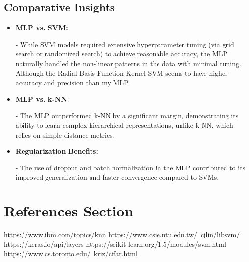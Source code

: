\documentclass[lettersize,journal]{IEEEtran}
\begin{document}
\subsection{\textbf{Comparative Insights}}
\begin{itemize}
    \item \textbf{MLP vs. SVM:}
    
    - While SVM models required extensive hyperparameter tuning (via grid search or randomized search) to achieve reasonable accuracy, the MLP naturally handled the non-linear patterns in the data with minimal tuning. Although the Radial Basis Function Kernel SVM seems to have higher accuracy and precision than my MLP.
    
    \item \textbf{MLP vs. k-NN:}
    
    - The MLP outperformed k-NN by a significant margin, demonstrating its ability to learn complex hierarchical representations, unlike k-NN, which relies on simple distance metrics.
    \item \textbf{Regularization Benefits:}
    
    - The use of dropout and batch normalization in the MLP contributed to its improved generalization and faster convergence compared to SVMs.
\end{itemize}


\section{\textbf{References Section}}
\begin{thebibliography}{1}

https://www.ibm.com/topics/knn
https://www.csie.ntu.edu.tw/~cjlin/libsvm/
https://keras.io/api/layers
https://scikit-learn.org/1.5/modules/svm.html
https://www.cs.toronto.edu/~kriz/cifar.html
\end{thebibliography}
\end{document}
